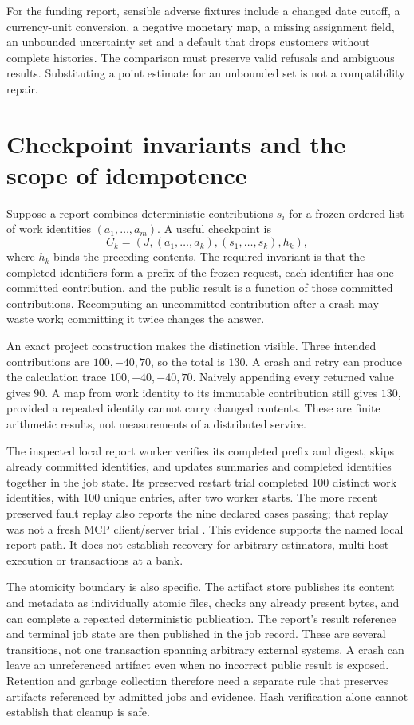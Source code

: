 For the funding report, sensible adverse fixtures include a changed date
cutoff, a currency-unit conversion, a negative monetary map, a missing
assignment field, an unbounded uncertainty set and a default that drops
customers without complete histories. The comparison must preserve valid
refusals and ambiguous results. Substituting a point estimate for an
unbounded set is not a compatibility repair.

\section{Checkpoint invariants and the scope of idempotence}

Suppose a report combines deterministic contributions $s_i$ for a frozen
ordered list of work identities $(a_1,\ldots,a_m)$. A useful checkpoint is
\[
 C_k=(J,(a_1,\ldots,a_k),(s_1,\ldots,s_k),h_k),
\]
where $h_k$ binds the preceding contents. The required invariant is that the
completed identifiers form a prefix of the frozen request, each identifier
has one committed contribution, and the public result is a function of those
committed contributions. Recomputing an uncommitted contribution after a
crash may waste work; committing it twice changes the answer.

An exact project construction makes the distinction visible. Three intended
contributions are $100,-40,70$, so the total is $130$. A crash and retry can
produce the calculation trace $100,-40,-40,70$. Naively appending every
returned value gives $90$. A map from work identity to its immutable
contribution still gives $130$, provided a repeated identity cannot carry
changed contents. These are finite arithmetic results, not measurements of
a distributed service\cite{exec13_ops_exact}.

The inspected local report worker verifies its completed prefix and digest,
skips already committed identities, and updates summaries and completed
identities together in the job state. Its preserved restart trial completed
100 distinct work identities, with 100 unique entries, after two worker
starts. The more recent preserved fault replay also reports the nine declared
cases passing; that replay was not a fresh MCP client/server trial
\cite{exec13_ops_source,exec13_ops_faults}. This evidence supports the named
local report path. It does not establish recovery for arbitrary estimators,
multi-host execution or transactions at a bank.

The atomicity boundary is also specific. The artifact store publishes its
content and metadata as individually atomic files, checks any already
present bytes, and can complete a repeated deterministic publication. The
report's result reference and terminal job state are then published in the
job record. These are several transitions, not one transaction spanning
arbitrary external systems. A crash can leave an unreferenced artifact even
when no incorrect public result is exposed. Retention and garbage collection
therefore need a separate rule that preserves artifacts referenced by admitted
jobs and evidence. Hash verification alone cannot establish that cleanup is
safe.


